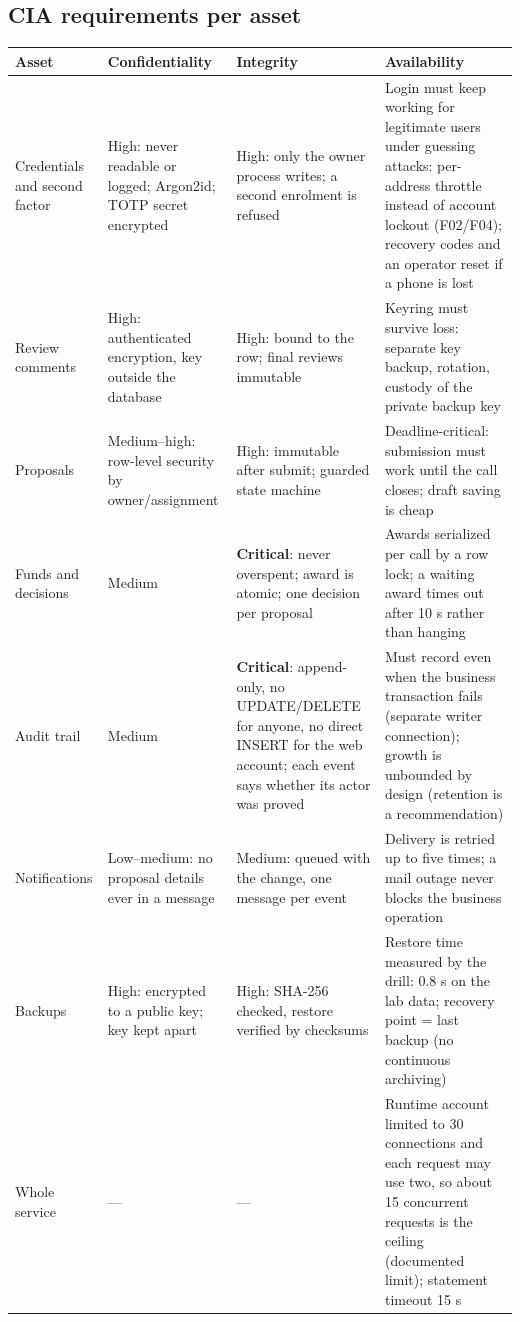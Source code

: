 \documentclass[10pt,a4paper]{article}
\newcommand{\tcap}[1]{\captionof{table}{#1}\nopagebreak[4]\vspace{-3pt}}
\begin{document}
\subsection{CIA requirements per asset}
\tcap{CIA requirements per asset}
\begin{center}\scriptsize
\begin{longtable}{@{}L{2.58cm}L{3.68cm}L{3.87cm}L{4.51cm}@{}}
\toprule\textbf{Asset} & \textbf{Confidentiality} & \textbf{Integrity} & \textbf{Availability}\\\midrule\endhead
Credentials and second factor & High: never readable or logged; Argon2id; TOTP secret encrypted & High: only the owner process writes; a second enrolment is refused & Login must keep working for legitimate users under guessing attacks: per-address throttle instead of account lockout (F02/F04); recovery codes and an operator reset if a phone is lost\\
Review comments & High: authenticated encryption, key outside the database & High: bound to the row; final reviews immutable & Keyring must survive loss: separate key backup, rotation, custody of the private backup key\\
Proposals & Medium--high: row-level security by owner/assignment & High: immutable after submit; guarded state machine & Deadline-critical: submission must work until the call closes; draft saving is cheap\\
Funds and decisions & Medium & \textbf{Critical}: never overspent; award is atomic; one decision per proposal & Awards serialized per call by a row lock; a waiting award times out after 10 s rather than hanging\\
Audit trail & Medium & \textbf{Critical}: append-only, no UPDATE/DELETE for anyone, no direct INSERT for the web account; each event says whether its actor was proved & Must record even when the business transaction fails (separate writer connection); growth is unbounded by design (retention is a recommendation)\\
Notifications & Low--medium: no proposal details ever in a message & Medium: queued with the change, one message per event & Delivery is retried up to five times; a mail outage never blocks the business operation\\
Backups & High: encrypted to a public key; key kept apart & High: SHA-256 checked, restore verified by checksums & Restore time measured by the drill: 0.8 s on the lab data; recovery point = last backup (no continuous archiving)\\
Whole service & --- & --- & Runtime account limited to 30 connections and each request may use two, so about 15 concurrent requests is the ceiling (documented limit); statement timeout 15 s\\
\bottomrule\end{longtable}\end{center}
\end{document}
